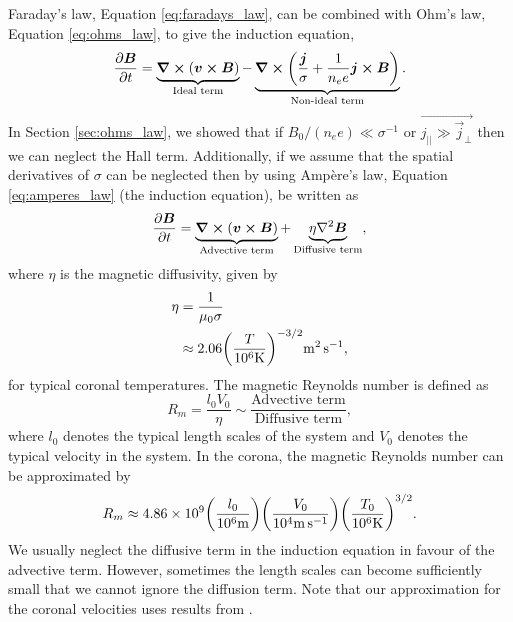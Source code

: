 Faraday's law, Equation \eqref{eq:faradays_law}, can be combined with Ohm's law, Equation \eqref{eq:ohms_law}, to give the induction equation,
\begin{equation}
    \label{eq:induction_equation}
    \pdv{\boldsymbol{B}}{t}=\underbrace{\curl(\boldsymbol{v}\cross\boldsymbol{B})}_{\text{Ideal term}}-\underbrace{\curl(\frac{\boldsymbol{j}}{\sigma}+\frac{1}{n_ee}\boldsymbol{j}\cross\boldsymbol{B})}_{\text{Non-ideal term}}.
\end{equation}
In Section \ref{sec:ohms_law}, we showed that if $B_0 / (n_e e) \ll \sigma^{-1}$ or $\vec{j_{||}\gg\vec{j}_\perp}$ then we can neglect the Hall term. Additionally, if we assume that the spatial derivatives of $\sigma$ can be neglected then by using Amp\`ere's law, Equation \eqref{eq:amperes_law} (the induction equation), be written as
\begin{equation}
    \pdv{\vec{B}}{t}=\underbrace{\curl(\vec{v}\cross\vec{B})}_{\text{Advective term}}+\underbrace{\eta\laplacian\vec{B}}_{\text{Diffusive term}},
\end{equation}
where $\eta$ is the magnetic diffusivity, given by
\begin{equation}
    \label{eq:eta_typical_values}
    \begin{aligned}
        \eta&=\frac{1}{\mu_0\sigma} \\
        &\approx 2.06\qty(\frac{T}{10^6\si{.K}})^{-3/2}\si{.m^2.s^{-1}},
    \end{aligned}
\end{equation}
for typical coronal temperatures. The magnetic Reynolds number is defined as
\begin{equation}
    R_m=\frac{l_0V_0}{\eta}\sim\frac{\text{Advective term}}{\text{Diffusive term}},
\end{equation}
where $l_0$ denotes the typical length scales of the system and $V_0$ denotes the typical velocity in the system. In the corona, the magnetic Reynolds number can be approximated by
\begin{equation}
    \label{eq:mag_reynolds_number}
    R_m\approx4.86\times10^{9}\qty(\frac{l_0}{10^6\si{.m}})\qty(\frac{V_0}{10^4\si{.m.s^{-1}}})\qty(\frac{T_0}{10^6\si{.K}})^{3/2}.
\end{equation}
We usually neglect the diffusive term in the induction equation in favour of the advective term. However, sometimes the length scales can become sufficiently small that we cannot ignore the diffusion term. Note that our approximation for the coronal velocities uses results from \citet{McIntosh2011,McIntosh2012}.

